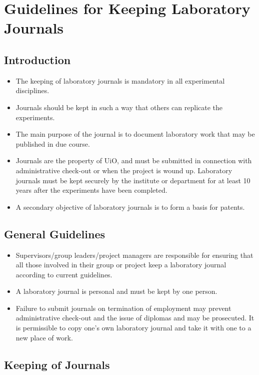 \chapter{Guidelines for Keeping Laboratory Journals}

\section*{Introduction}

\begin{itemize}
\item The keeping of laboratory journals is mandatory in all
experimental disciplines.
\item Journals should be kept in such a way that others can replicate
the experiments.
\item The main purpose of the journal is to document laboratory work
that may be published in due course.
\item Journals are the property of UiO, and must be submitted in
connection with administrative check-out or when the project is
wound up. Laboratory journals must be kept securely by the
institute or department for at least 10 years after the
experiments have been completed.
\item A secondary objective of laboratory journals is to form a basis
for patents.
\end{itemize}

\section*{General Guidelines}

\begin{itemize}
\item Supervisors/group leaders/project managers are responsible for
ensuring that all those involved in their group or project keep a
laboratory journal according to current guidelines.
\item A laboratory journal is personal and must be kept by one
person.
\item Failure to submit journals on termination of employment may
prevent administrative check-out and the issue of diplomas and
may be prosecuted. It is permissible to copy one's own
laboratory journal and take it with one to a new place of work.
\end{itemize}

\section*{Keeping of Journals}

